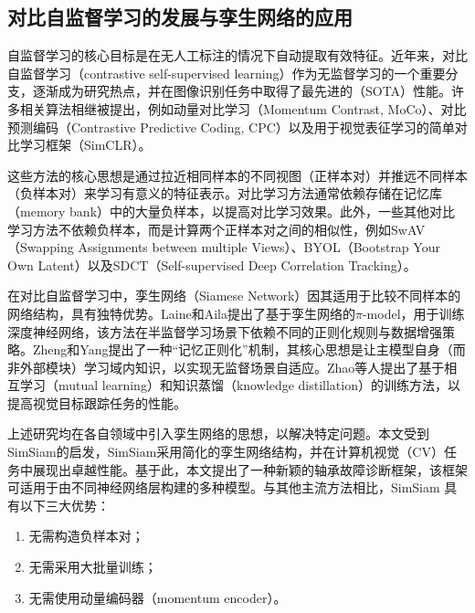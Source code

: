 \documentclass[master]{thesis-uestc}
\begin{document}
\subsection{对比自监督学习的发展与孪生网络的应用}

自监督学习的核心目标是在无人工标注的情况下自动提取有效特征。近年来，对比自监督学习（contrastive self-supervised learning）作为无监督学习的一个重要分支，逐渐成为研究热点，并在图像识别任务中取得了最先进的（SOTA）性能。许多相关算法相继被提出，例如动量对比学习（Momentum Contrast, MoCo）、对比预测编码（Contrastive Predictive Coding, CPC）以及用于视觉表征学习的简单对比学习框架（SimCLR）。

这些方法的核心思想是通过拉近相同样本的不同视图（正样本对）并推远不同样本（负样本对）来学习有意义的特征表示。对比学习方法通常依赖存储在记忆库（memory bank）中的大量负样本，以提高对比学习效果。此外，一些其他对比学习方法不依赖负样本，而是计算两个正样本对之间的相似性，例如SwAV（Swapping Assignments between multiple Views）、BYOL（Bootstrap Your Own Latent）以及SDCT（Self-supervised Deep Correlation Tracking）。

在对比自监督学习中，孪生网络（Siamese Network）因其适用于比较不同样本的网络结构，具有独特优势。Laine和Aila提出了基于孪生网络的$\pi$-model，用于训练深度神经网络，该方法在半监督学习场景下依赖不同的正则化规则与数据增强策略。Zheng和Yang提出了一种“记忆正则化”机制，其核心思想是让主模型自身（而非外部模块）学习域内知识，以实现无监督场景自适应。Zhao等人提出了基于相互学习（mutual learning）和知识蒸馏（knowledge distillation）的训练方法，以提高视觉目标跟踪任务的性能。

上述研究均在各自领域中引入孪生网络的思想，以解决特定问题。本文受到SimSiam的启发，SimSiam采用简化的孪生网络结构，并在计算机视觉（CV）任务中展现出卓越性能。基于此，本文提出了一种新颖的轴承故障诊断框架，该框架可适用于由不同神经网络层构建的多种模型。与其他主流方法相比，SimSiam 具有以下三大优势：
\begin{enumerate}[label={(\arabic*)}]
    \item 无需构造负样本对；
    \item 无需采用大批量训练；
    \item 无需使用动量编码器（momentum encoder）。
\end{enumerate}
\end{document}
